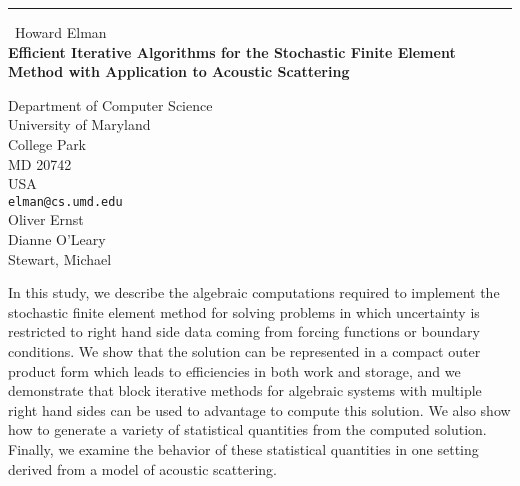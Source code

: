 \documentclass{report}
\begin{document}
\begin{center}
\rule{6in}{1pt} \
{\large Howard Elman \\
{\bf Efficient Iterative Algorithms for the Stochastic Finite Element Method with Application to Acoustic Scattering}}

Department of Computer Science \\ University of Maryland \\ College Park \\ MD 20742 \\ USA
\\
{\tt elman@cs.umd.edu}\\
Oliver Ernst\\
Dianne O'Leary\\
	Stewart, Michael\end{center}

In this study, we describe the algebraic computations required to
implement the stochastic finite element method for solving problems in
which uncertainty is restricted to right hand side data coming from
forcing functions or boundary conditions.
We show that the solution can be represented in a compact outer product
form which leads to efficiencies in both work and storage, and we
demonstrate that block iterative methods for algebraic systems with
multiple right hand sides can be used to advantage to compute this
solution.
We also show how to generate a variety of statistical quantities from the
computed solution.
Finally, we examine the behavior of these statistical quantities in one
setting derived from a model of acoustic scattering.
\end{document}

